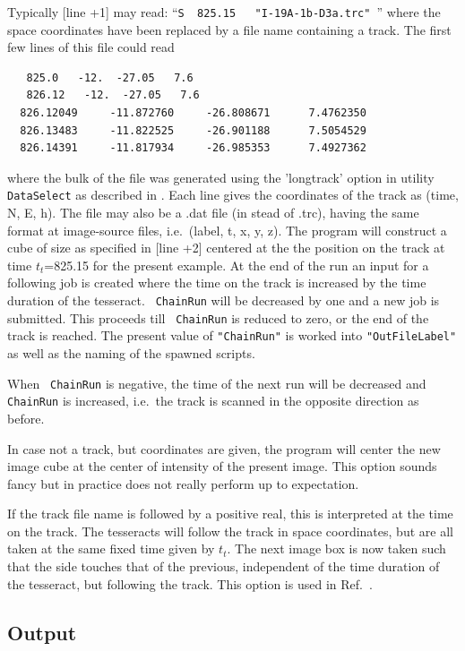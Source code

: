 Typically [line +1] may read:  ``\verb#S  825.15   "I-19A-1b-D3a.trc" #'' where the space coordinates have been replaced by a file name containing a track. The first few lines of this file could read
{\tiny
\begin{verbatim}
   825.0   -12.  -27.05   7.6
   826.12   -12.  -27.05   7.6
  826.12049     -11.872760     -26.808671      7.4762350
  826.13483     -11.822525     -26.901188      7.5054529
  826.14391     -11.817934     -26.985353      7.4927362
\end{verbatim}
}
where the bulk of the file was generated using the 'longtrack' option in utility \verb!DataSelect! as described in . Each line gives the coordinates of the track as (time, N, E, h). The file may also be a .dat file (in stead of .trc),  having the same format at image-source files, i.e.\ (label, t, x, y, z). The program will construct a cube of size as specified in [line +2] centered at the the position on the track at time $t_t$=825.15 for the present example. At the end of the run an input for a following job is created where the time on the track is increased by the time duration of the tesseract. \verb# ChainRun# will be decreased by one and a new job is submitted. This proceeds till \verb# ChainRun# is reduced to zero, or the end of the track is reached. The present value of \verb!"ChainRun"! is worked into \verb!"OutFileLabel"! as well as the naming of the spawned scripts.

When \verb# ChainRun# is negative, the time of the next run will be decreased and \verb# ChainRun# is increased, i.e.\ the track is scanned in the opposite direction as before.

In case not a track, but coordinates are given, the program will center the new image cube at the center of intensity of the present image. This option sounds fancy but in practice does not really perform up to expectation.

If the track file name is followed by a positive real, this is interpreted at the time on the track. The tesseracts will follow the track in space coordinates, but are all taken at the same fixed time given by $t_t$. The next image box is now taken such that the side touches that of the previous, independent of the time duration of the tesseract, but following the track. This option is used in Ref.~\cite{Scholten:2023PL}.

\subsection{Output}

